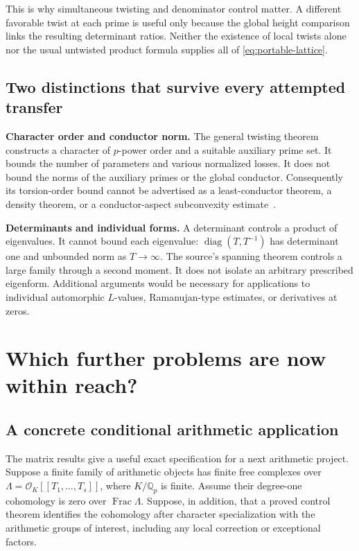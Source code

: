 \documentclass[11pt,letterpaper]{article}
\theoremstyle{remark}
\newcommand{\Q}{\mathbb Q}
\begin{document}
This is why simultaneous twisting and denominator control matter. A
different favorable twist at each prime is useful only because the global
height comparison links the resulting determinant ratios. Neither the
existence of local twists alone nor the usual untwisted product formula
supplies all of \eqref{eq:portable-lattice}.

\subsection{Two distinctions that survive every attempted transfer}

\textbf{Character order and conductor norm.} The general twisting theorem
constructs a character of $p$-power order and a suitable auxiliary prime
set. It bounds the number of parameters and various normalized losses.
It does not bound the norms of the auxiliary primes or the global
conductor. Consequently its torsion-order bound cannot be advertised as a
least-conductor theorem, a density theorem, or a conductor-aspect
subconvexity estimate~\cite{general}.

\textbf{Determinants and individual forms.} A determinant controls a product
of eigenvalues. It cannot bound each eigenvalue: $\operatorname{diag}(T,T^{-1})$
has determinant one and unbounded norm as $T\to\infty$. The source's
spanning theorem controls a large family through a second moment. It does
not isolate an arbitrary prescribed eigenform. Additional arguments would
be necessary for applications to individual automorphic $L$-values,
Ramanujan-type estimates, or derivatives at zeros.





\section{Which further problems are now within reach?}
\label{sec:targets}

\subsection{A concrete conditional arithmetic application}

The matrix results give a useful exact specification for a next arithmetic
project. Suppose a finite family of arithmetic objects has finite free
complexes over
$\Lambda=\mathcal O_K[[T_1,\ldots,T_s]]$, where $K/\Q_p$ is finite.
Assume their degree-one cohomology is zero over $\operatorname{Frac}\Lambda$.
Suppose, in addition, that a proved control theorem identifies the
cohomology after character specialization with the arithmetic groups of
interest, including any local correction or exceptional factors.
\end{document}
